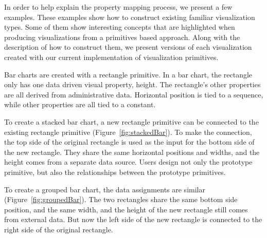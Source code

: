 \label{examples}

In order to help explain the property mapping process, we present a few examples.
These examples show how to construct existing familiar visualization types.
Some of them show interesting concepts that are highlighted when producing visualizations from a primitives based approach.
Along with the description of how to construct them, we present versions of each visualization created with our current implementation of visualization primitives.

\label{barChart}

Bar charts are created with a rectangle primitive.
In a bar chart, the rectangle only has one data driven visual property, height.
The rectangle's other properties are all derived from administrative data.
Horizontal position is tied to a sequence, while other properties are all tied to a constant.

To create a stacked bar chart, a new rectangle primitive can be connected to the existing rectangle primitive (Figure~\ref{fig:stackedBar}).
To make the connection, the top side of the original rectangle is used as the input for the bottom side of the new rectangle.
They share the same horizontal positions and widths, and the height comes from a separate data source.
Users design not only the prototype primitive, but also the relationships between the prototype primitives.

To create a grouped bar chart, the data assignments are similar (Figure~\ref{fig:groupedBar}).
The two rectangles share the same bottom side position, and the same width, and the height of the new rectangle still comes from external data.
But now the left side of the new rectangle is connected to the right side of the original rectangle.

